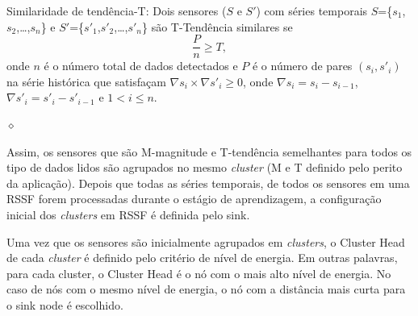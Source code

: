 \documentclass{acm_proc_article-sp}
\newcommand{\dia}{\hspace*{.1cm} \hfill $\diamond$}
\begin{document}
\begin{defini}

Similaridade de tendência-T: Dois sensores ($S$ e $S'$) com séries temporais
$S$=\{$s_{1}$,$s_{2}$,\ldots,$s_{n}$\} e
$S'$=\{$s'_{1}$,$s'_{2}$,\ldots,$s'_{n}$\} são T-Tendência similares  se
\begin{equation}
\label{equ:trend}
\frac{P}{n} \geq T,
\end{equation}
onde $n$ é o número total de dados detectados e $P$ é o número de pares
$(s_{i},s'_{i})$ na série histórica que satisfaçam $\nabla s_{i} \times \nabla
s'_{i} \geq 0$, onde $\nabla s_{i} = s_{i} - s_{i-1}$, $\nabla
s'_{i} = s'_{i} - s'_{i-1}$ e $1 < i \leq n$.

\dia
\end{defini}
\vspace*{-.5cm}

Assim, os sensores que são M-magnitude e T-tendência semelhantes para
todos os tipo de dados lidos são agrupados no mesmo {\it cluster} (M e T definido
pelo perito da aplicação). Depois que todas as séries temporais, de todos os 
sensores em uma RSSF forem processadas durante o estágio de aprendizagem,
a configuração inicial dos {\it clusters} em RSSF é definida pelo sink.
\vspace*{-.3cm}

Uma vez que os sensores são inicialmente agrupados em {\it clusters},
o Cluster Head de cada {\it cluster} é definido pelo critério de nível de energia.
Em outras palavras, para cada cluster, o Cluster Head é o nó com o mais alto
nível de energia. No caso de nós com o mesmo nível de energia, o nó com a
distância mais curta para o sink node é escolhido.
\vspace*{-.3cm}
\end{document}

